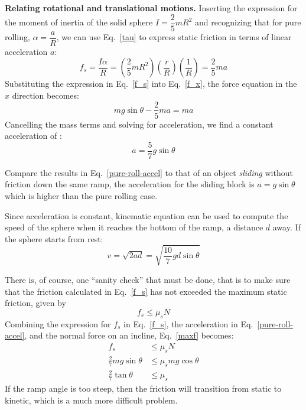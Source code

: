 \documentclass{../../oss-handout}
\newcommand{\xx}{\hat x}
\begin{document}
\textbf{Relating rotational and translational motions.} Inserting the
expression for the moment of inertia of the solid sphere $I=\dfrac25 mR^2$
and recognizing that for pure rolling, $\alpha=\dfrac aR$, we can use
Eq.~\ref{tau} to express static friction in terms of linear acceleration $a$:
\begin{equation}
  f_s=\frac{I\alpha}R=
  \left(\frac25 mR^2\right)
  \left(\frac rR\right)
  \left(\frac1R\right)=\frac25ma
  \label{f_s}
\end{equation}
Substituting the expression in Eq.~\ref{f_s} into Eq.~\ref{f_x}, the force
equation in the $\xx$ direction becomes:
\begin{equation}
  mg\sin\theta-\frac25 ma=ma
\end{equation}
Cancelling the mass terms and solving for acceleration, we find a constant
acceleration of :
\begin{equation}
  a=\frac57 g\sin\theta
  \label{pure-roll-accel}
\end{equation}

Compare the results in Eq.~\ref{pure-roll-accel} to that of an object
\emph{sliding} without friction down the same ramp, the acceleration for the
sliding block is $a=g\sin\theta$ which is higher than the pure rolling case.

Since acceleration is constant, kinematic equation can be used to compute the
speed of the sphere when it reaches the bottom of the ramp, a distance $d$ away.
If the sphere starts from rest:
\begin{equation}
  v=\sqrt{2ad}=\sqrt{\frac{10}7gd\sin\theta}
\end{equation}

There is, of course, one ``sanity check'' that must be done, that is to make
sure that the friction calculated in Eq.~\ref{f_s} has not exceeded the maximum
static friction, given by
\begin{equation}
  f_s\leq\mu_s N
  \label{maxf}
\end{equation}
Combining the expression for $f_s$ in Eq.~\ref{f_s}, the acceleration in
Eq.~\ref{pure-roll-accel}, and the normal force on an incline, Eq.~\ref{maxf}
becomes:
\begin{align}
  f_s&\leq\mu_sN\\
  \frac27mg\sin\theta&\leq\mu_smg\cos\theta\\
  \frac27\tan\theta&\leq\mu_s
\end{align}
If the ramp angle is too steep, then the friction will transition from static
to kinetic, which is a much more difficult problem.
\end{document}
